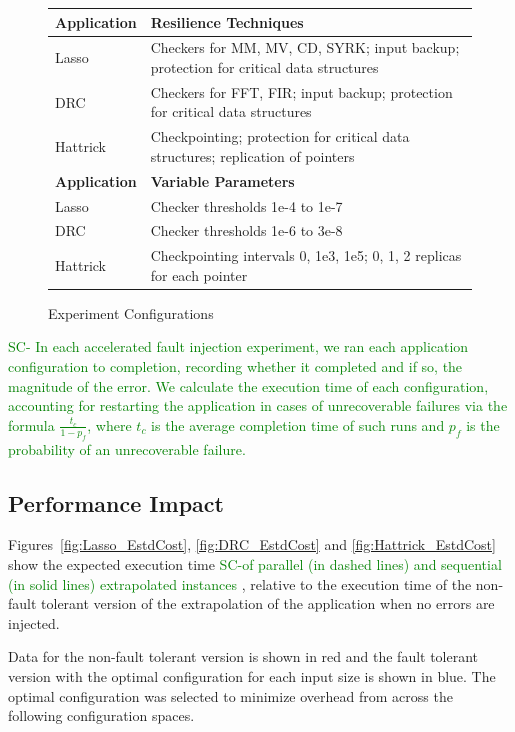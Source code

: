 \documentclass{sig-alternate}
\newcommand{\sui}[1]{%
  \textcolor{green}{SC-#1}
}
\begin{document}
\begin{figure}[ht!]
\centering
\begin{tabular}{|p{0.7in}|p{2.0in}|}
\hline
{\bf Application} & {\bf Resilience Techniques} \\
\hline
\hline
Lasso & Checkers for MM, MV, CD, SYRK; input backup; protection for critical data structures \\ 
\hline
DRC & Checkers for FFT, FIR; input backup; protection for critical data structures \\
\hline
Hattrick & Checkpointing; protection for critical data structures; replication of pointers \\
\hline
\hline
{\bf Application} & {\bf Variable Parameters} \\
\hline
\hline
Lasso & Checker thresholds 1e-4 to 1e-7 \\
\hline
DRC   & Checker thresholds 1e-6 to 3e-8 \\
\hline
Hattrick & Checkpointing intervals 0, 1e3, 1e5; 0, 1, 2 replicas for each pointer \\
\hline
\end{tabular}
\caption{Experiment Configurations}
\label{fig:exp_confs}
\end{figure}

\sui{
	In each accelerated fault injection experiment, we ran each application configuration to completion, recording whether it completed and if so, the magnitude of the
	error.
	We calculate the execution time of each configuration, accounting for restarting the application in cases of unrecoverable failures via the formula $\frac{t_c}{1-p_f}$, where $t_c$ is the average completion time of such runs and $p_f$ is the probability of an unrecoverable failure.
}

\subsection{Performance Impact}
\label{sec:eval:perf}
Figures~\ref{fig:Lasso_EstdCost}, \ref{fig:DRC_EstdCost} and \ref{fig:Hattrick_EstdCost} show the expected execution time \sui{of parallel (in dashed lines) and sequential (in solid lines) extrapolated instances}, relative to the execution time of the non-fault tolerant version of the extrapolation of the application when no errors are injected.

Data for the non-fault tolerant version is shown in red and the fault tolerant version with the optimal configuration for each input size is shown in blue.
The optimal configuration was selected to minimize overhead from across the following configuration spaces.
\end{document}
